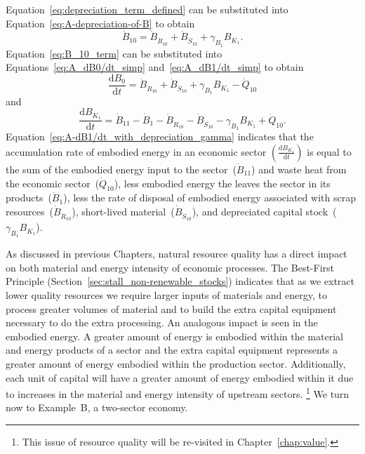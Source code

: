 Equation~\ref{eq:depreciation_term_defined} can be substituted into
Equation~\ref{eq:A-depreciation-of-B} to obtain
%
\begin{equation} \label{eq:B_10_term}
	\dot{B}_{10}
	= \dot{B}_{\dot{R}_{10}}
	+ \dot{B}_{\dot{S}_{10}}
	+ \gamma_{B_{1}} B_{K_{1}}.	
\end{equation}
%
Equation~\ref{eq:B_10_term} 
can be substituted into Equations~\ref{eq:A_dB0/dt_simp}
and~\ref{eq:A_dB1/dt_simp} to obtain 
%
\begin{equation} \label{eq:A-dB0/dt_with_depreciation_gamma}
	\frac{\mathrm{d}B_{0}}{\mathrm{d}t} 
	= \dot{B}_{\dot{R}_{10}}
	+ \dot{B}_{\dot{S}_{10}}
	+ \gamma_{B_{1}} B_{K_{1}}
	- \dot{Q}_{10} 
\end{equation}
%
and
%
\begin{equation} \label{eq:A-dB1/dt_with_depreciation_gamma}
	\frac{\mathrm{d}B_{K_{1}}}{\mathrm{d}t} 
	= \dot{B}_{11}
	- \dot{B}_{1}
	- \dot{B}_{\dot{R}_{10}}
	- \dot{B}_{\dot{S}_{10}}
	- \gamma_{B_{1}} B_{K_{1}}
	+ \dot{Q}_{10}.
\end{equation}
%
Equation~\ref{eq:A-dB1/dt_with_depreciation_gamma} 
indicates that the accumulation rate 
of embodied energy in an economic sector 
$\left( \frac{\mathrm{d}B_{K_{1}}}{\mathrm{d}t} \right)$
is equal to the sum of the embodied energy input to the sector~($\dot{B}_{11}$)
and waste heat from the economic sector~($\dot{Q}_{10}$),
less embodied energy the leaves the sector in its products~($\dot{B}_{1}$), 
less the rate of disposal of embodied energy associated with 
scrap resources~($\dot{B}_{\dot{R}_{10}}$),
short-lived material~($\dot{B}_{\dot{S}_{10}}$), and
depreciated capital stock~($\gamma_{B_{1}} B_{K_{1}}$).

As discussed in previous Chapters,
natural resource quality has a direct impact on both
material and energy intensity of economic processes.
The Best-First Principle (Section~\ref{sec:stall_non-renewable_stocks})
indicates that as we extract lower quality resources we require
larger inputs of materials and energy,
to process greater volumes of material
and to build the extra capital equipment
necessary to do the extra processing.
An analogous impact is seen in the embodied energy.
A greater amount of energy is embodied within the 
material and energy products of a sector 
and the extra capital equipment
represents a greater amount of energy embodied within the
production sector.
Additionally, each unit of capital will have a greater amount of
energy embodied within it due to increases in 
the material and energy intensity of 
upstream sectors.%
	\footnote{  %
	This issue 
	of resource quality will be re-visited in 
	Chapter~\ref{chap:value}.
	}
We turn now to Example~B, a two-sector economy.


